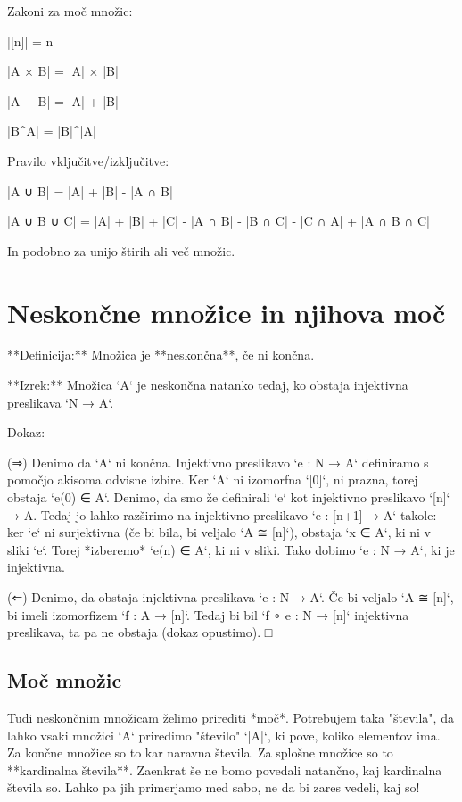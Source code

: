 Zakoni za moč množic:

    |[n]| = n

    |A × B| = |A| × |B|

    |A + B| = |A| + |B|

    |B^A| = |B|^|A|

Pravilo vključitve/izključitve:

    |A ∪ B| = |A| + |B| - |A ∩ B|

    |A ∪ B ∪ C| = |A| + |B| + |C| - |A ∩ B| - |B ∩ C| - |C ∩ A| + |A ∩ B ∩ C|

In podobno za unijo štirih ali več množic.


\section{Neskončne množice in njihova moč}

**Definicija:** Množica je **neskončna**, če ni končna.

**Izrek:** Množica `A` je neskončna natanko tedaj, ko obstaja injektivna preslikava `N → A`.

Dokaz:

(⇒) Denimo da `A` ni končna. Injektivno preslikavo `e : N → A` definiramo s
pomočjo akisoma odvisne izbire. Ker `A` ni izomorfna `[0]`, ni prazna, torej
obstaja `e(0) ∈ A`. Denimo, da smo že definirali `e` kot injektivno preslikavo
`[n]` → A. Tedaj jo lahko razširimo na injektivno preslikavo `e : [n+1] → A`
takole: ker `e` ni surjektivna (če bi bila, bi veljalo `A ≅ [n]`), obstaja `x ∈
A`, ki ni v sliki `e`. Torej *izberemo* `e(n) ∈ A`, ki ni v sliki. Tako dobimo
`e : N → A`, ki je injektivna.

(⇐) Denimo, da obstaja injektivna preslikava `e : N → A`. Če bi veljalo `A ≅
[n]`, bi imeli izomorfizem `f : A → [n]`. Tedaj bi bil `f ∘ e : N → [n]`
injektivna preslikava, ta pa ne obstaja (dokaz opustimo). □

\subsection{Moč množic}

Tudi neskončnim množicam želimo prirediti *moč*. Potrebujem taka "števila", da
lahko vsaki množici `A` priredimo "število" `|A|`, ki pove, koliko elementov
ima. Za končne množice so to kar naravna števila. Za splošne množice so to
**kardinalna števila**. Zaenkrat še ne bomo povedali natančno, kaj kardinalna
števila so. Lahko pa jih primerjamo med sabo, ne da bi zares vedeli, kaj so!

